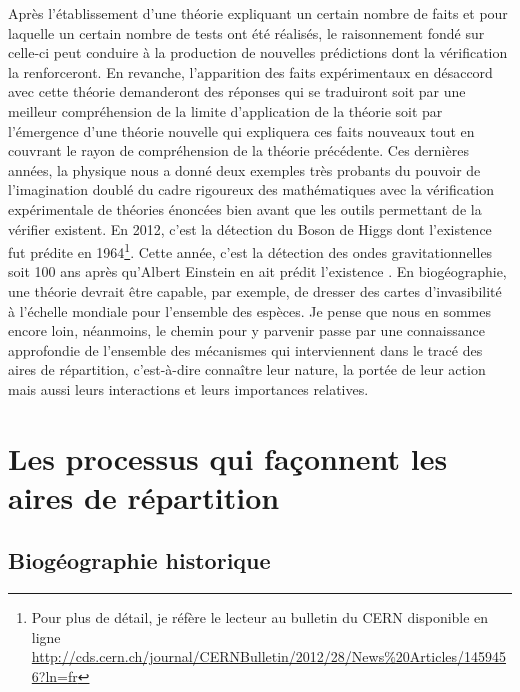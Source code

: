 Après l'établissement d'une théorie expliquant un certain nombre de
faits et pour laquelle un certain nombre de tests ont été réalisés, le
raisonnement fondé sur celle-ci peut conduire à la production de
nouvelles prédictions dont la vérification la renforceront. En revanche,
l'apparition des faits expérimentaux en désaccord avec cette théorie
demanderont des réponses qui se traduiront soit par une meilleur
compréhension de la limite d'application de la théorie soit par
l'émergence d'une théorie nouvelle qui expliquera ces faits nouveaux
tout en couvrant le rayon de compréhension de la théorie précédente. Ces
dernières années, la physique nous a donné deux exemples très probants
du pouvoir de l'imagination doublé du cadre rigoureux des mathématiques
avec la vérification expérimentale de théories énoncées bien avant que
les outils permettant de la vérifier existent. En 2012, c'est la
détection du Boson de Higgs dont l'existence fut prédite en
1964\footnote{Pour plus de détail, je réfère le lecteur au bulletin du
  CERN disponible en ligne
  \url{http://cds.cern.ch/journal/CERNBulletin/2012/28/News\%20Articles/1459456?ln=fr}}.
Cette année, c'est la détection des ondes gravitationnelles soit 100 ans
après qu'Albert Einstein en ait prédit l'existence \citep{Waldrop2016}.
En biogéographie, une théorie devrait être capable, par exemple, de
dresser des cartes d'invasibilité à l'échelle mondiale pour l'ensemble
des espèces. Je pense que nous en sommes encore loin, néanmoins, le
chemin pour y parvenir passe par une connaissance approfondie de
l'ensemble des mécanismes qui interviennent dans le tracé des aires de
répartition, c'est-à-dire connaître leur nature, la portée de leur
action mais aussi leurs interactions et leurs importances relatives.

\section*{Les processus qui façonnent les aires de
répartition}\label{les-processus-qui-fauxe7onnent-les-aires-de-ruxe9partition}

\subsection*{Biogéographie
historique}\label{bioguxe9ographie-historique}

